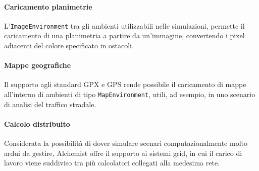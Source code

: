 \paragraph{Caricamento planimetrie} L'\texttt{ImageEnvironment} tra gli ambienti utilizzabili nelle simulazioni, permette il caricamento di una planimetria a partire da un'immagine, convertendo i pixel adiacenti del colore specificato in ostacoli.

\paragraph{Mappe geografiche} Il supporto agli standard GPX e GPS rende possibile il caricamento di mappe all'interno di  ambienti di tipo \texttt{MapEnvironment}, utili, ad esempio, in uno scenario di analisi del traffico stradale.

\paragraph{Calcolo distribuito} Considerata la possibilità di dover simulare scenari computazionalmente molto ardui da gestire, Alchemist offre il supporto ai sistemi grid, in cui il carico di lavoro viene suddiviso tra più calcolatori collegati alla medesima rete.

